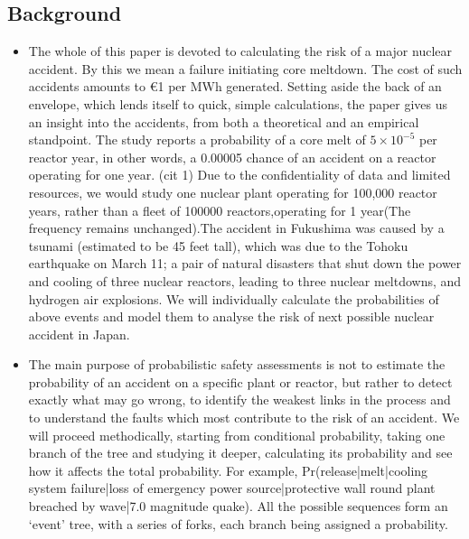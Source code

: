 \documentclass{article}
\begin{document}
\subsection{Background}
\begin{itemize}
    \item The whole of this paper is devoted to calculating the risk of a major nuclear accident.  By this we mean a failure initiating core meltdown. The cost of such accidents amounts to €1 per MWh generated. Setting aside the back of an envelope, which lends itself to quick, simple calculations, the paper gives us an insight into the accidents, from both a theoretical and an empirical standpoint. The study reports a probability of a core melt of $5\times10^{-5}$ per reactor year, in other words, a 0.00005 chance of an accident on a reactor operating for one year. (cit 1) Due to the confidentiality of data and limited resources, we would study one nuclear plant operating for 100,000 reactor years, rather than a fleet of 100000 reactors,operating for 1 year(The frequency remains unchanged).The accident in Fukushima was caused by a tsunami (estimated to be 45 feet tall), which was due to the Tohoku earthquake on March 11; a pair of natural disasters that shut down the power and cooling of three nuclear reactors, leading to three nuclear meltdowns, and hydrogen air explosions. We will individually calculate the probabilities of above events and model them to analyse the risk of next possible nuclear accident in Japan.


    \item
    The main purpose of probabilistic safety assessments is not to estimate the probability of an accident on a specific plant or reactor, but rather to detect exactly what may go wrong, to identify the weakest links in the process and to understand the faults which most contribute to the risk of an accident. We will proceed methodically, starting from conditional probability, taking one branch of the tree and studying it deeper, calculating its probability and see how it affects the total probability. For example, Pr(release|melt|cooling system failure|loss of emergency power source|protective wall round plant breached by wave|7.0 magnitude quake). All the possible sequences form an ‘event’ tree, with a series of forks, each branch being assigned a probability.


\end{itemize}
\end{document}
